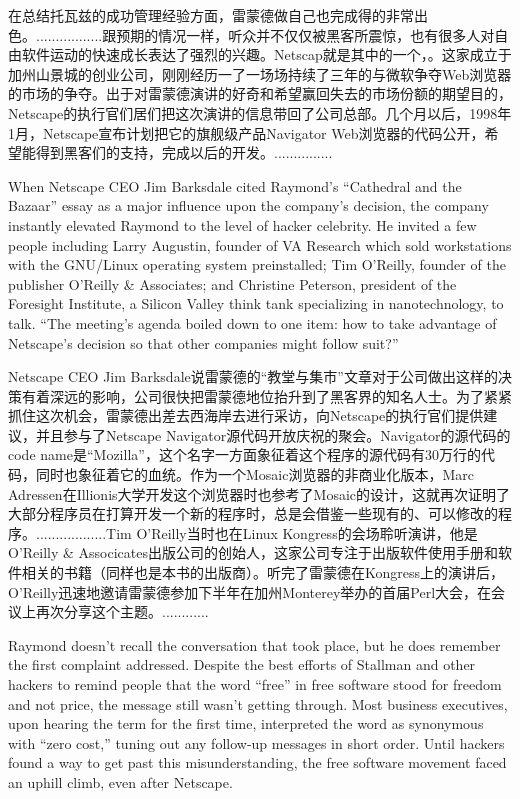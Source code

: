 \ifdefined\chs
在总结托瓦兹的成功管理经验方面，雷蒙德做自己也完成得的非常出色。.................跟预期的情况一样，听众并不仅仅被黑客所震惊，也有很多人对自由软件运动的快速成长表达了强烈的兴趣。Netscap就是其中的一个，。这家成立于加州山景城的创业公司，刚刚经历一了一场场持续了三年的与微软争夺Web浏览器的市场的争夺。出于对雷蒙德演讲的好奇和希望赢回失去的市场份额的期望目的，Netscape的执行官们居们把这次演讲的信息带回了公司总部。几个月以后，1998年1月，Netscape宣布计划把它的旗舰级产品Navigator Web浏览器的代码公开，希望能得到黑客们的支持，完成以后的开发。...............
\fi

\ifdefined\eng
When Netscape CEO Jim Barksdale cited Raymond's ``Cathedral and the Bazaar'' essay as a major influence upon the company's decision, the company instantly elevated Raymond to the level of hacker celebrity. He invited a few people including Larry Augustin, founder of VA Research which sold workstations with the GNU/Linux operating system preinstalled; Tim O'Reilly,  founder of the publisher O'Reilly \& Associates; and Christine Peterson, president of the Foresight Institute, a Silicon Valley think tank specializing in nanotechnology, to talk. ``The meeting's agenda boiled down to one item: how to take advantage of Netscape's decision so that other companies might follow suit?''
\fi

\ifdefined\chs
Netscape CEO Jim Barksdale说雷蒙德的``教堂与集市''文章对于公司做出这样的决策有着深远的影响，公司很快把雷蒙德地位抬升到了黑客界的知名人士。为了紧紧抓住这次机会，雷蒙德出差去西海岸去进行采访，向Netscape的执行官们提供建议，并且参与了Netscape Navigator源代码开放庆祝的聚会。Navigator的源代码的code name是``Mozilla''，这个名字一方面象征着这个程序的源代码有30万行的代码，同时也象征着它的血统。作为一个Mosaic浏览器的非商业化版本，Marc Adressen在Illionis大学开发这个浏览器时也参考了Mosaic的设计，这就再次证明了大部分程序员在打算开发一个新的程序时，总是会借鉴一些现有的、可以修改的程序。..................Tim O'Reilly当时也在Linux Kongress的会场聆听演讲，他是O'Reilly \& Associcates出版公司的创始人，这家公司专注于出版软件使用手册和软件相关的书籍（同样也是本书的出版商）。听完了雷蒙德在Kongress上的演讲后，O'Reilly迅速地邀请雷蒙德参加下半年在加州Monterey举办的首届Perl大会，在会议上再次分享这个主题。............
\fi

\ifdefined\eng
Raymond doesn't recall the conversation that took place, but he does remember the first complaint addressed. Despite the best efforts of Stallman and other hackers to remind people that the word ``free'' in free software stood for freedom and not price, the message still wasn't getting through. Most business executives, upon hearing the term for the first time, interpreted the word as synonymous with ``zero cost,'' tuning out any follow-up messages in short order. Until hackers found a way to get past this misunderstanding, the free software movement faced an uphill climb, even after Netscape.
\fi

